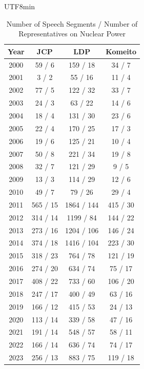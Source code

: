 \documentclass[final,5p,times,twocolumn,authoryear]{elsarticle}
\begin{document}
\begin{table}[h]
\begin{CJK}{UTF8}{min}
    \centering
    \begin{tabular}{c|ccc}
        \hline
        Year & JCP & LDP & Komeito \\
        \hline
        2000 & 59 / 6 & 159 / 18 & 34 / 7 \\
        2001 & 3 / 2 & 55 / 16 & 11 / 4 \\
        2002 & 77 / 5 & 122 / 32 & 33 / 7 \\
        2003 & 24 / 3 & 63 / 22 & 14 / 6 \\
        2004 & 18 / 4 & 131 / 30 & 23 / 6 \\
        2005 & 22 / 4 & 170 / 25 & 17 / 3 \\
        2006 & 19 / 6 & 125 / 21 & 10 / 4 \\
        2007 & 50 / 8 & 221 / 34 & 19 / 8 \\
        2008 & 32 / 7 & 121 / 29 & 9 / 5 \\
        2009 & 13 / 3 & 114 / 29 & 12 / 6 \\
        2010 & 49 / 7 & 79 / 26 & 29 / 4 \\
        2011 & 565 / 15 & 1864 / 144 & 415 / 30 \\
        2012 & 314 / 14 & 1199 / 84 & 144 / 22 \\
        2013 & 273 / 16 & 1204 / 106 & 146 / 24 \\
        2014 & 374 / 18 & 1416 / 104 & 223 / 30 \\
        2015 & 318 / 23 & 764 / 78 & 121 / 19 \\
        2016 & 274 / 20 & 634 / 74 & 75 / 17 \\
        2017 & 408 / 22 & 733 / 60 & 106 / 20 \\
        2018 & 247 / 17 & 400 / 49 & 63 / 16 \\
        2019 & 166 / 12 & 415 / 53 & 24 / 13 \\
        2020 & 113 / 14 & 339 / 58 & 47 / 16 \\
        2021 & 191 / 14 & 548 / 57 & 58 / 11 \\
        2022 & 166 / 14 & 636 / 74 & 74 / 17 \\
        2023 & 256 / 13 & 883 / 75 & 119 / 18 \\
        \hline
    \end{tabular}
    \caption{Number of Speech Segments / Number of Representatives on Nuclear Power}
    \label{tab:nuclear_speech}
	\end{CJK}
\end{table}
\end{document}
